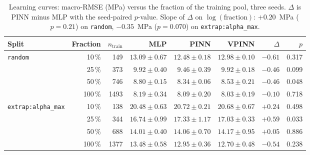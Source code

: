 \documentclass[subscriptcorrection,upint,varvw,barcolor=Goldenrod3,mathalfa=cal=euler,balance,hyphenate,french,pdf-a]{asmejour} %
\begin{document}
\begin{table}[t]
\caption{Learning curves: macro-RMSE (MPa) versus the fraction of the training pool, three seeds. $\Delta$ is PINN minus MLP with the seed-paired $p$-value. Slope of $\Delta$ on $\log(\text{fraction})$: $+0.20$~MPa ($p=0.21$) on \texttt{random}, $-0.35$~MPa ($p=0.070$) on \texttt{extrap:alpha\_max}.}
\label{tab:curves}
\centering\small
\begin{tabular}{@{}lrrrrrrr@{}}
\toprule
Split & Fraction & $n_{\mathrm{train}}$ & MLP & PINN & VPINN & $\Delta$ & $p$ \\
\midrule
\texttt{random} & 10\,\%  & 149  & $13.09\pm0.67$ & $12.48\pm0.18$ & $12.98\pm0.10$ & $-0.61$ & 0.317 \\
                & 25\,\%  & 373  & $9.92\pm0.40$  & $9.46\pm0.39$  & $9.92\pm0.18$  & $-0.46$ & 0.099 \\
                & 50\,\%  & 746  & $8.80\pm0.15$  & $8.34\pm0.06$  & $8.53\pm0.21$  & $-0.46$ & 0.048 \\
                & 100\,\% & 1493 & $8.19\pm0.34$  & $8.09\pm0.20$  & $8.03\pm0.19$  & $-0.10$ & 0.718 \\
\addlinespace
\texttt{extrap:alpha\_max} & 10\,\%  & 138  & $20.48\pm0.63$ & $20.72\pm0.21$ & $20.68\pm0.67$ & $+0.24$ & 0.498 \\
                           & 25\,\%  & 344  & $16.74\pm0.99$ & $17.33\pm1.17$ & $17.03\pm0.33$ & $+0.59$ & 0.033 \\
                           & 50\,\%  & 688  & $14.01\pm0.40$ & $14.06\pm0.70$ & $14.17\pm0.95$ & $+0.05$ & 0.886 \\
                           & 100\,\% & 1377 & $13.48\pm0.58$ & $12.95\pm0.36$ & $12.70\pm0.48$ & $-0.54$ & 0.238 \\
\bottomrule
\end{tabular}
\end{table}
\end{document}
